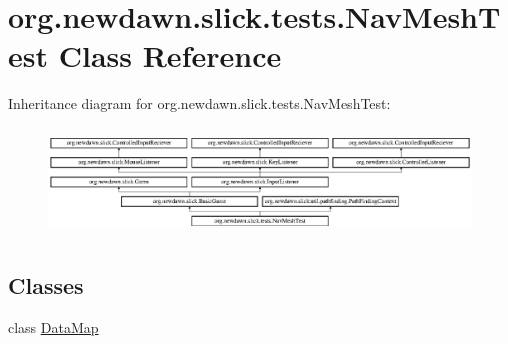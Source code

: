 \hypertarget{classorg_1_1newdawn_1_1slick_1_1tests_1_1_nav_mesh_test}{}\section{org.\+newdawn.\+slick.\+tests.\+Nav\+Mesh\+Test Class Reference}
\label{classorg_1_1newdawn_1_1slick_1_1tests_1_1_nav_mesh_test}
Inheritance diagram for org.\+newdawn.\+slick.\+tests.\+Nav\+Mesh\+Test\+:\begin{figure}[H]
\begin{center}
\leavevmode
\includegraphics[height=2.880659cm]{classorg_1_1newdawn_1_1slick_1_1tests_1_1_nav_mesh_test}
\end{center}
\end{figure}
\subsection*{Classes}
\begin{DoxyCompactItemize}
\item 
class \mbox{\hyperlink{classorg_1_1newdawn_1_1slick_1_1tests_1_1_nav_mesh_test_1_1_data_map}{Data\+Map}}
\end{DoxyCompactItemize}
